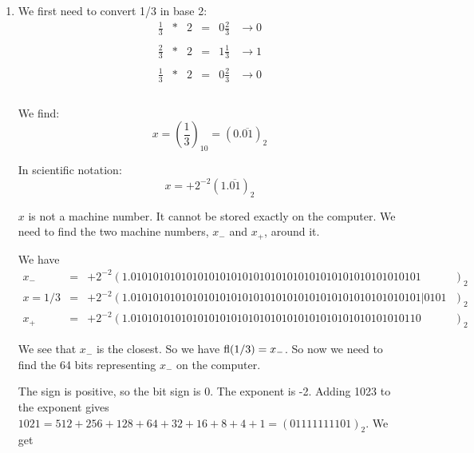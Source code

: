 \documentclass[pdftex,11pt]{article}
\begin{document}
\begin{enumerate}
\begin{comment}


\underline{Matlab Check}:
\begin{verbatim}

>> format hex; 1/8, format

ans =

   3fc0000000000000

\end{verbatim}
\end{comment}

\item 
We first need to convert 1/3 in base 2:
$$
\begin{array}{rcrccc}
\frac{1}{3}& *& 2   & = & 0\frac{2}{3}&    \rightarrow     0  \\\\
\frac{2}{3}& *& 2   & = & 1\frac{1}{3}&    \rightarrow     1  \\\\
\hline
\frac{1}{3}& *& 2   & = & 0\frac{2}{3}&    \rightarrow     0  \\\\
\end{array}
$$

We find:
$$x = (\frac{1}{3})_{10} = (0.\overline{01})_2 $$

In scientific notation:
$$x = + 2^{-2} (1.\overline{01})_2 $$

$x$ is not a machine number. It cannot be stored exactly on the computer. We
need to find the two machine numbers, $x_-$ and $x_+$, around it.

We have
\begin{eqnarray}
 \nonumber x_-       & = &  + 2^{-2} ( 1.0101010101010101010101010101010101010101010101010101\phantom{|0101}~~~)_2\\
 \nonumber x = 1/3   & = &  + 2^{-2} ( 1.0101010101010101010101010101010101010101010101010101|0101~~~)_2\\ 
 \nonumber x_+       & = &  + 2^{-2} ( 1.0101010101010101010101010101010101010101010101010110\phantom{|0101}~~~)_2
\end{eqnarray}

We see that $x_-$ is the closest. So we have $\textmd{fl}(1/3) = x_-$. So now we need to find the 
64 bits representing $x_-$ on the computer.

The sign is positive, so the bit sign is $0$.
The exponent is -2. Adding 1023 to the exponent gives $1021 =
512+256+128+64+32+16+8+4+1 = (01111111101)_2.$
We get\\


\end{enumerate}
\end{document}
